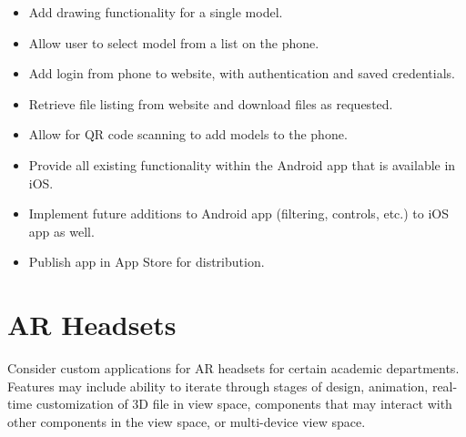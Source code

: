 \begin{enumerate}
\begin{itemize}
                \item Add drawing functionality for a single model.

                \item Allow user to select model from a list on the phone.

                \item Add login from phone to website, with authentication and saved credentials.

                \item Retrieve file listing from website and download files as requested.

                \item Allow for QR code scanning to add models to the phone.

                \item Provide all existing functionality within the Android app that is available in iOS.

                \item Implement future additions to Android app (filtering, controls, etc.) to iOS app as well.

                \item Publish app in App Store for distribution.

            \end{itemize}
        \end{enumerate}

    \section{AR Headsets}

    Consider custom applications for AR headsets for certain academic departments. Features may include ability to iterate through stages of design, animation, real-time customization of 3D file in view space, components that may interact with other components in the view space, or multi-device view space. 